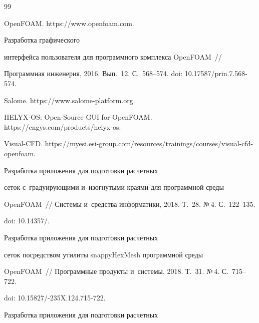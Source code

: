 {\small\frenchspacing


{%




\begin{thebibliography}{99}




OpenFOAM. {\sf https://www.openfoam.com}.




 Разработка графического 


интерфейса пользователя для программного комплекса \mbox{OpenFOAM}~/\!\!/ 


Программная инженерия, 2016. Вып.~12. С.~568--574. doi: 10.17587\!/\!prin.7.568-574.




Salome. {\sf https://www.salome-platform.org}.




HELYX-OS: Open-Source GUI for OpenFOAM. {\sf https://engys.com/products/\linebreak helyx-os}.




Visual-CFD. {\sf https://myesi.esi-group.com/resources/trainings/courses/visual-cfd-openfoam}.




 Разработка приложения для подготовки расчетных 


сеток с~градуирующими и~изогнутыми краями для программной среды 


\mbox{OpenFOAM}~/\!\!/ Системы и~средства информатики, 2018. Т.~28. №\,4. С.~122--135. 


doi: 10.14357\!/.




 Разработка приложения для подготовки расчетных 


сеток посредством утилиты \mbox{snappyHexMesh} программной среды 


\mbox{OpenFOAM}~/\!\!/ Программные продукты и~системы, 2018. Т.~31. №\,4. С.~715--722. 


doi:  10.15827\!/-235X.124.715-722. 




 Разработка приложения для подготовки расчетных 



\end{thebibliography}}}

